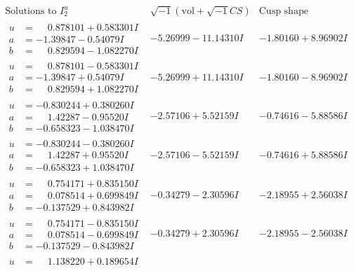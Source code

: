 \documentclass[1p]{elsarticle_modified}
\theoremstyle{definition}
\newcommand{\I}{\sqrt{-1}}
\begin{document}
$$\begin{array}{c|c|c}  
\text{Solutions to }I^u_{2}& \I (\text{vol} + \sqrt{-1}CS) & \text{Cusp shape}\\
 \hline 
\begin{aligned}
u &= \phantom{-}0.878101 + 0.583301 I \\
a &= -1.39847 - 0.54079 I \\
b &= \phantom{-}0.829594 - 1.082270 I\end{aligned}
 & -5.26999 - 11.14310 I & -1.80160 + 8.96902 I \\ \hline\begin{aligned}
u &= \phantom{-}0.878101 - 0.583301 I \\
a &= -1.39847 + 0.54079 I \\
b &= \phantom{-}0.829594 + 1.082270 I\end{aligned}
 & -5.26999 + 11.14310 I & -1.80160 - 8.96902 I \\ \hline\begin{aligned}
u &= -0.830244 + 0.380260 I \\
a &= \phantom{-}1.42287 - 0.95520 I \\
b &= -0.658323 - 1.038470 I\end{aligned}
 & -2.57106 + 5.52159 I & -0.74616 - 5.88586 I \\ \hline\begin{aligned}
u &= -0.830244 - 0.380260 I \\
a &= \phantom{-}1.42287 + 0.95520 I \\
b &= -0.658323 + 1.038470 I\end{aligned}
 & -2.57106 - 5.52159 I & -0.74616 + 5.88586 I \\ \hline\begin{aligned}
u &= \phantom{-}0.754171 + 0.835150 I \\
a &= \phantom{-}0.078514 + 0.699849 I \\
b &= -0.137529 + 0.843982 I\end{aligned}
 & -0.34279 - 2.30596 I & -2.18955 + 2.56038 I \\ \hline\begin{aligned}
u &= \phantom{-}0.754171 - 0.835150 I \\
a &= \phantom{-}0.078514 - 0.699849 I \\
b &= -0.137529 - 0.843982 I\end{aligned}
 & -0.34279 + 2.30596 I & -2.18955 - 2.56038 I \\ \hline\begin{aligned}
u &= \phantom{-}1.138220 + 0.189654 I \\

\end{aligned}
\end{array}$$
\end{document}

